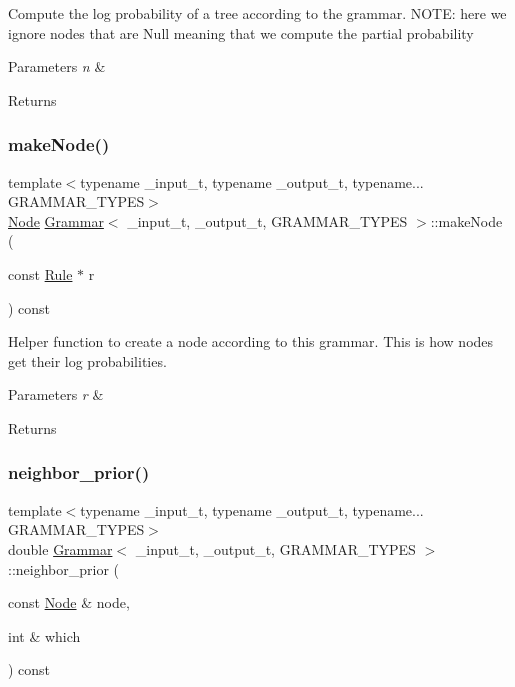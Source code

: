 Compute the log probability of a tree according to the grammar. N\+O\+TE\+: here we ignore nodes that are Null meaning that we compute the partial probability 
\begin{DoxyParams}{Parameters}
{\em n} & \\
\hline
\end{DoxyParams}
\begin{DoxyReturn}{Returns}

\end{DoxyReturn}
\mbox{\label{class_grammar_aec960301035c8f5f1f8e62338bb3f860}} 
\subsubsection{\texorpdfstring{make\+Node()}{makeNode()}}
{\footnotesize\ttfamily template$<$typename \+\_\+input\+\_\+t, typename \+\_\+output\+\_\+t, typename... G\+R\+A\+M\+M\+A\+R\+\_\+\+T\+Y\+P\+ES$>$ \\
\hyperlink{class_node}{Node} \hyperlink{class_grammar}{Grammar}$<$ \+\_\+input\+\_\+t, \+\_\+output\+\_\+t, G\+R\+A\+M\+M\+A\+R\+\_\+\+T\+Y\+P\+ES $>$\+::make\+Node (\begin{DoxyParamCaption}\item[{const \hyperlink{class_rule}{Rule} $\ast$}]{r }\end{DoxyParamCaption}) const\hspace{0.3cm}{\ttfamily [inline]}}

Helper function to create a node according to this grammar. This is how nodes get their log probabilities. 
\begin{DoxyParams}{Parameters}
{\em r} & \\
\hline
\end{DoxyParams}
\begin{DoxyReturn}{Returns}

\end{DoxyReturn}
\mbox{\label{class_grammar_a195bd7a052b34884c2e006cbd6ed3c94}} 
\subsubsection{\texorpdfstring{neighbor\+\_\+prior()}{neighbor\_prior()}}
{\footnotesize\ttfamily template$<$typename \+\_\+input\+\_\+t, typename \+\_\+output\+\_\+t, typename... G\+R\+A\+M\+M\+A\+R\+\_\+\+T\+Y\+P\+ES$>$ \\
double \hyperlink{class_grammar}{Grammar}$<$ \+\_\+input\+\_\+t, \+\_\+output\+\_\+t, G\+R\+A\+M\+M\+A\+R\+\_\+\+T\+Y\+P\+ES $>$\+::neighbor\+\_\+prior (\begin{DoxyParamCaption}\item[{const \hyperlink{class_node}{Node} \&}]{node,  }\item[{int \&}]{which }\end{DoxyParamCaption}) const\hspace{0.3cm}{\ttfamily [inline]}}

